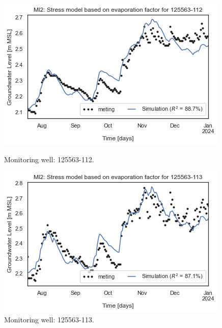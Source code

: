 \begin{figure}[htbp]
    \centering
    \begin{minipage}{0.32\textwidth}
        \centering
        \includegraphics[width=\linewidth]{frontmatter/Heijplaat-fig/125563-112.png}
        \caption{Monitoring well: 125563-112.}
        \label{SM: 125563-112}
    \end{minipage}
    \hfill
    \begin{minipage}{0.32\textwidth}
        \centering
        \includegraphics[width=\linewidth]{frontmatter/Heijplaat-fig/125563-113.png}
        \caption{Monitoring well: 125563-113.}
        \label{SM: 125563-113}
    \end{minipage}
    \hfill
    \begin{minipage}{0.32\textwidth}
        \centering

\end{minipage}
\end{figure}
